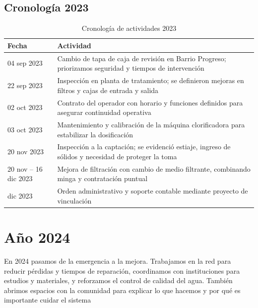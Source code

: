\subsection*{Cronología 2023}
\begin{table}[H]
\centering
\caption{Cronología de actividades 2023}
\label{tab:cronologia_2023}
\begin{singlespace}
\begin{tabular}{p{3cm} p{11cm}}
\toprule
\textbf{Fecha} & \textbf{Actividad} \\
\midrule
04 sep 2023 & Cambio de tapa de caja de revisión en Barrio Progreso; priorizamos seguridad y tiempos de intervención \\
22 sep 2023 & Inspección en planta de tratamiento; se definieron mejoras en filtros y cajas de entrada y salida \\
02 oct 2023 & Contrato del operador con horario y funciones definidos para asegurar continuidad operativa \\
03 oct 2023 & Mantenimiento y calibración de la máquina clorificadora para estabilizar la dosificación \\
20 nov 2023 & Inspección a la captación; se evidenció estiaje, ingreso de sólidos y necesidad de proteger la toma \\
20 nov -- 16 dic 2023 & Mejora de filtración con cambio de medio filtrante, combinando minga y contratación puntual \\
dic 2023 & Orden administrativo y soporte contable mediante proyecto de vinculación \\
\bottomrule
\end{tabular}
\end{singlespace}
\end{table}

\section{Año 2024}

En 2024 pasamos de la emergencia a la mejora. Trabajamos en la red para reducir pérdidas y tiempos de reparación, coordinamos con instituciones para estudios y materiales, y reforzamos el control de calidad del agua. También abrimos espacios con la comunidad para explicar lo que hacemos y por qué es importante cuidar el sistema

